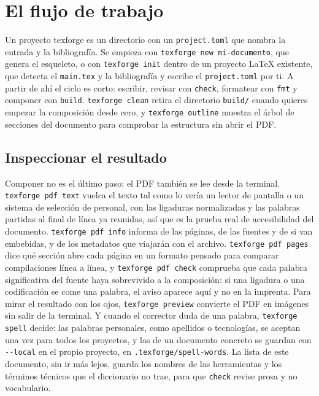 \section{El flujo de trabajo}\label{sec:flujo}

Un proyecto texforge es un directorio con un \texttt{project.toml} que nombra
la entrada y la bibliografía. Se empieza con \texttt{texforge new
  mi-documento}, que genera el esqueleto, o con \texttt{texforge init} dentro
de un proyecto \LaTeX{} existente, que detecta el \texttt{main.tex} y la
bibliografía y escribe el \texttt{project.toml} por ti. A partir de ahí
el ciclo es corto: escribir, revisar con \texttt{check}, formatear con
\texttt{fmt} y componer con \texttt{build}. \texttt{texforge clean} retira el
directorio \texttt{build/} cuando quieres empezar la composición desde
cero, y \texttt{texforge outline} muestra el árbol de secciones del
documento para comprobar la estructura sin abrir el PDF.

\subsection{Inspeccionar el resultado}

Componer no es el último paso: el PDF también se lee desde la terminal.
\texttt{texforge pdf text} vuelca el texto tal como lo vería un lector de
pantalla o un sistema de selección de personal, con las ligaduras
normalizadas y las palabras partidas al final de línea ya reunidas, así
que es la prueba real de accesibilidad del documento. \texttt{texforge pdf
  info} informa de las páginas, de las fuentes y de si van embebidas, y de
los metadatos que viajarán con el archivo. \texttt{texforge pdf pages}
dice qué sección abre cada página en un formato pensado para comparar
compilaciones línea a línea, y \texttt{texforge pdf check} comprueba que
cada palabra significativa del fuente haya sobrevivido a la composición:
si una ligadura o una codificación se come una palabra, el aviso aparece
aquí y no en la imprenta. Para mirar el resultado con los ojos,
\texttt{texforge preview} convierte el PDF en imágenes sin salir de la
terminal. Y cuando el corrector duda de una palabra, \texttt{texforge spell}
decide: las palabras personales, como apellidos o tecnologías, se aceptan
una vez para todos los proyectos, y las de un documento concreto se guardan
con \texttt{-{}-local} en el propio proyecto, en \texttt{.texforge/spell-words}.
La lista de este documento, sin ir más lejos, guarda los nombres de las
herramientas y los términos técnicos que el diccionario no trae, para que
\texttt{check} revise prosa y no vocabulario.


